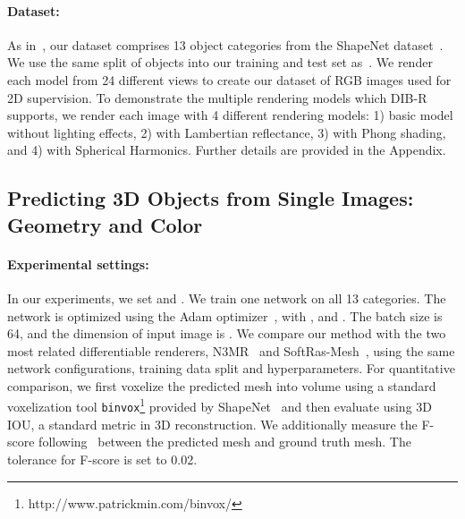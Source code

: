 \documentclass{article}
\newcommand{\model}{DIB-R}
\begin{document}
\begin{minipage}[t] {0.09\textwidth}
\vspace{-1mm}
\paragraph{Dataset: }
As in~\cite{NMR,liu2019soft,wang2018pixel2mesh}, our dataset comprises 13 object categories from the ShapeNet dataset~\cite{ShapeNet}. We use the same split of objects into our training and test set as~\cite{wang2018pixel2mesh}. We render each model from 24 different views to create our dataset of RGB images used for 2D supervision. To demonstrate the multiple rendering models which {\model } supports, we render each image with 4 different rendering models: 1) basic model without lighting effects, 2) with Lambertian reflectance, 3) with Phong shading, and 4) with  Spherical Harmonics. Further details are provided in the Appendix.


 \vspace{-6pt}
\subsection{Predicting 3D Objects from Single Images: Geometry and Color}
\vspace{-5pt}
\paragraph{Experimental settings:} In our experiments,  we set  and . We train one network on all 13 categories. The network is optimized using the Adam optimizer~\cite{kingma2014adam}, with , and . The batch size is 64, and the dimension of input image is .  We compare our method with the two most related differentiable renderers, N3MR~\cite{NMR} and SoftRas-Mesh~\cite{liu2019soft}, using the same network configurations, training data split and hyperparameters. For quantitative comparison, we first voxelize the predicted mesh into  volume using a standard voxelization tool \texttt{binvox}\footnote{http://www.patrickmin.com/binvox/} provided by ShapeNet~\cite{ShapeNet} and then evaluate using 3D IOU, a standard metric in 3D reconstruction. We additionally measure the F-score following~\cite{tatarchenko2019single} between the predicted mesh and ground truth mesh. The tolerance for F-score is set to 0.02.


\end{minipage}
\end{document}
